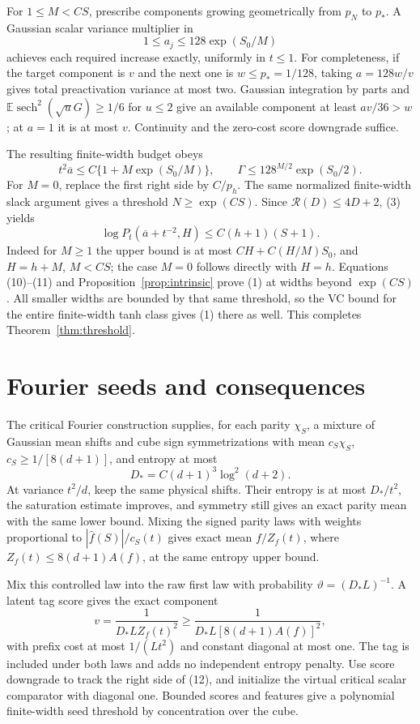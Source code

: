 \documentclass[11pt]{article}
\theoremstyle{remark}\newtheorem{remark}[theorem]{Remark}
\newcommand{\E}{\mathbb E}\newcommand{\R}{\mathbb R}
\begin{document}
For $1\le M<CS$, prescribe components growing geometrically from
$p_N$ to $p_*$. A Gaussian scalar variance multiplier in
\[
 1\le a_j\le128\exp(S_0/M)                       \tag{9}
\]
achieves each required increase exactly, uniformly in $t\le1$.
For completeness, if the target component is $v$ and the next one
is $w\le p_*=1/128$, taking $a=128w/v$ gives total preactivation
variance at most two. Gaussian integration by parts and
$\E\operatorname{sech}^2(\sqrt uG)\ge1/6$ for $u\le2$ give
an available component at least $av/36>w$; at $a=1$ it is at most
$v$. Continuity and the zero-cost score downgrade suffice.

The resulting finite-width budget obeys
\[
 t^2\overline a\le C\{1+M\exp(S_0/M)\},\qquad
 \Gamma\le128^{M/2}\exp(S_0/2).                  \tag{10}
\]
For $M=0$, replace the first right side by $C/p_h$.
The same normalized finite-width slack argument gives a threshold
$N\ge\exp(CS)$. Since $\mathcal R(D)\le4D+2$, (3) yields
\[
 \log P_t(\overline a+t^{-2},H)
 \le C(h+1)(S+1).                               \tag{11}
\]
Indeed for $M\ge1$ the upper bound is at most
$C H+C(H/M)S_0$, and $H=h+M$, $M<CS$; the case $M=0$ follows
directly with $H=h$.
Equations (10)--(11) and Proposition~\ref{prop:intrinsic} prove
(1) at widths beyond $\exp(CS)$. All smaller widths are bounded
by that same threshold, so the VC bound for the entire finite-width
tanh class gives (1) there as well. This completes
Theorem~\ref{thm:threshold}.

\section{Fourier seeds and consequences}
The critical Fourier construction supplies, for each parity $\chi_S$,
a mixture of Gaussian mean shifts and cube sign symmetrizations
with mean $c_S\chi_S$, $c_S\ge1/[8(d+1)]$, and entropy at most
\[
 D_*=C(d+1)^3\log^2(d+2).
\]
At variance $t^2/d$, keep the same physical shifts. Their entropy is
at most $D_*/t^2$, the saturation estimate improves, and symmetry
still gives an exact parity mean with the same lower bound. Mixing
the signed parity laws with weights proportional to
$|\widehat f(S)|/c_S(t)$ gives exact mean $f/Z_f(t)$, where
$Z_f(t)\le8(d+1)A(f)$, at the same entropy upper bound.

Mix this controlled law into the raw first law with probability
$\vartheta=(D_*L)^{-1}$. A latent tag score gives the exact component
\[
 v=\frac1{D_*LZ_f(t)^2}\ge
 \frac1{D_*L[8(d+1)A(f)]^2},                     \tag{12}
\]
with prefix cost at most $1/(Lt^2)$ and constant diagonal at most
one. The tag is included under both laws and adds no independent
entropy penalty. Use score downgrade to track the right side of
(12), and initialize the virtual critical scalar comparator with
diagonal one. Bounded scores and features give a polynomial
finite-width seed threshold by concentration over the cube.
\end{document}
